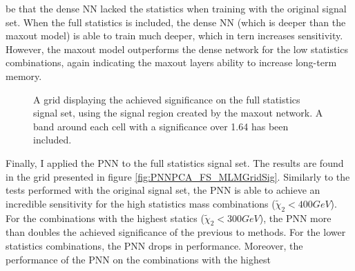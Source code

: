 be that the dense \ac{NN} lacked the statistics when training with the original signal set. When the full statistics is included,
the dense \ac{NN} (which is deeper than the maxout model) is able to train much deeper, which in tern increases sensitivity. 
However, the maxout model outperforms the dense network for the low statistics combinations, again indicating the maxout layers
ability to increase long-term memory.\\
\begin{figure}
    \caption{A grid displaying the achieved significance on the full statistics signal set, using the signal region 
    created by the maxout network. A band around each cell with a significance over 1.64 has been included.}
    \label{fig:MaxOutPCA_FS_MLMGridSig}
\end{figure}
Finally, I applied the \ac{PNN} to the full statistics signal set. The results are found in the grid presented in figure \ref{fig:PNNPCA_FS_MLMGridSig}.
Similarly to the tests performed with the original signal set, the \ac{PNN} is able to achieve an incredible sensitivity for the high statistics mass combinations
($\tilde{\chi}_2<400GeV$). For the combinations with the highest statics ($\tilde{\chi}_2<300GeV$), the \ac{PNN} more than doubles the achieved significance of the previous 
to methods. For the lower statistics combinations, the \ac{PNN} drops in performance. Moreover, the performance of the \ac{PNN} on the combinations with the highest 
